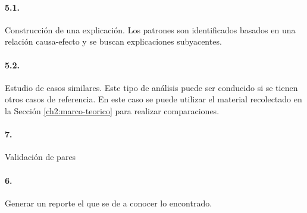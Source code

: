 \paragraph{5.1.} Construcción de una explicación. Los patrones son identificados basados en una relación causa-efecto y se buscan explicaciones subyacentes. 

\paragraph{5.2.} Estudio de casos similares. Este tipo de análisis puede ser conducido si se tienen otros casos de referencia. En este caso se puede utilizar el material recolectado en la Sección \ref{ch2:marco-teorico} para realizar comparaciones.


\paragraph{7.} Validación de pares

\paragraph{6.} Generar un reporte el que se de a conocer lo encontrado.
 